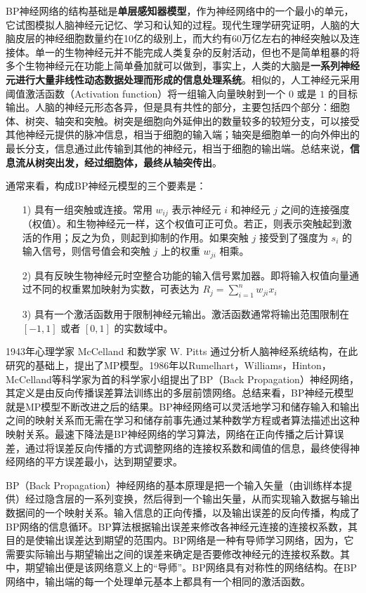\documentclass[UTF8]{ctexart}
\begin{document}
BP神经网络的结构基础是\textbf{单层感知器模型}，作为神经网络中的一个最小的单元，它试图模拟人脑神经元记忆、学习和认知的过程。现代生理学研究证明，人脑的大脑皮层的神经细胞数量约在10亿的级别上，而大约有60万亿左右的神经突触以及连接体。单一的生物神经元并不能完成人类复杂的反射活动，但也不是简单粗暴的将多个生物神经元在功能上简单叠加就可以做到，事实上，人类的大脑是\textbf{一系列神经元进行大量非线性动态数据处理而形成的信息处理系统}。相似的，人工神经元采用阈值激活函数（Activation function）将一组输入向量映射到一个 $0$ 或是 $1$ 的目标输出。人脑的神经元形态各异，但是具有共性的部分，主要包括四个部分：细胞体、树突、轴突和突触。树突是细胞向外延伸出的数量较多的较短分支，可以接受其他神经元提供的脉冲信息，相当于细胞的输入端；轴突是细胞单一的向外伸出的最长分支，信息通过此传输到其他的神经元，相当于细胞的输出端。总结来说，\textbf{信息流从树突出发，经过细胞体，最终从轴突传出}。 \par

通常来看，构成BP神经元模型的三个要素是：

\begin{itemize}
\item [1)]
具有一组突触或连接。常用 $w_{ij}$ 表示神经元 $i$ 和神经元 $j$ 之间的连接强度（权值）。和生物神经元一样，这个权值可正可负。若正，则表示突触起到激活的作用；反之为负，则起到抑制的作用。如果突触 $j$ 接受到了强度为 $s_i$ 的输入信号，则信号值会和突触 $j$ 上的权重 $w_{ji}$ 相乘。
\item [2)]
具有反映生物神经元时空整合功能的输入信号累加器。即将输入权值向量通过不同的权重累加映射为实数，可表达为 $R_j = \sum_{i=1}^{n}w_{ji}x_{i}$
\item [3)]
具有一个激活函数用于限制神经元输出。激活函数通常将输出范围限制在 $[-1,1]$ 或者 $[0,1]$ 的实数域中。
\end{itemize}

1943年心理学家 McCelland 和数学家 W. Pitts 通过分析人脑神经系统结构，在此研究的基础上，提出了MP模型。1986年以Rumelhart，Williams，Hinton，McCelland等科学家为首的科学家小组提出了BP（Back Propagation）神经网络，其定义是由反向传播误差算法训练出的多层前馈网络。总结来看，BP神经元模型就是MP模型不断改进之后的结果。BP神经网络可以灵活地学习和储存输入和输出之间的映射关系而无需在学习和储存前事先通过某种数学方程或者算法描述出这种映射关系。最速下降法是BP神经网络的学习算法，网络在正向传播之后计算误差，通过将误差反向传播的方式调整网络的连接权系数和阈值的信息，最终使得神经网络的平方误差最小，达到期望要求。 \par

BP（Back Propagation）神经网络的基本原理是把一个输入矢量（由训练样本提供）经过隐含层的一系列变换，然后得到一个输出矢量，从而实现输入数据与输出数据间的一个映射关系。输入信息的正向传播，以及输出误差的反向传播，构成了BP网络的信息循环。BP算法根据输出误差来修改各神经元连接的连接权系数，其目的是使输出误差达到期望的范围内。BP网络是一种有导师学习网络，因为，它需要实际输出与期望输出之间的误差来确定是否要修改神经元的连接权系数。其中，期望输出便是该网络意义上的“导师”。BP网络具有对称性的网络结构。在BP网络中，输出端的每一个处理单元基本上都具有一个相同的激活函数。
\end{document}
